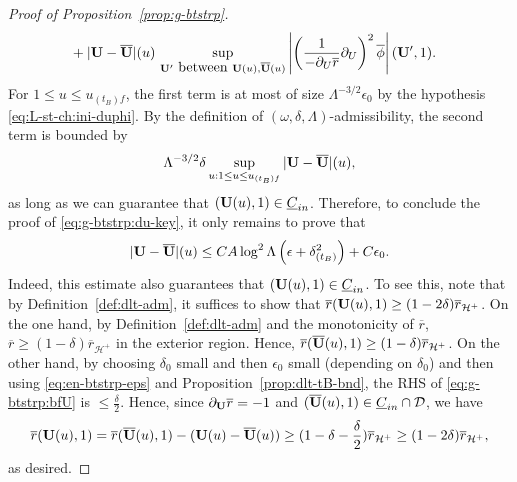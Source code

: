 \documentclass[10pt, reqno]{amsart}
\theoremstyle{definition}
\theoremstyle{remark}
\theoremstyle{conjecture}
\numberwithin{equation}{section}
\newcommand{\abs}[1]{\vert#1\vert}
\newcommand{\rd}{\partial}
\newcommand{\0}{\emptyset}
\newcommand{\dlt}{\delta}
\newcommand{\eps}{\epsilon}
\newcommand{\Lmb}{\Lambda}
\newcommand{\omg}{\omega}
\newcommand{\bfU}{{\bf U}}
\newcommand{\calD}{\mathcal D}
\newcommand{\calH}{\mathcal H}
\newcommand{\uC}{\underline{C}}
\newcommand{\f}{\frac}
\newcommand{\de}{\delta}
\newcommand{\EH}{\calH^{+}}
\newcommand{\bfUbg}{\overline{\bfU}}				%
\newcommand{\phibg}{\overline{\phi}}				%
\newcommand{\rbg}{\overline{r}}					%
\newcommand{\Abs}[1]{\left\vert #1 \right\vert}
\begin{document}
\begin{proof}[Proof of Proposition~\ref{prop:g-btstrp}]
\begin{align*}
		&+ \abs{\bfU - \bfUbg}(u) \, \sup_{\bfU' \hbox{ between } \bfU(u), \bfUbg(u)} \Abs{\left( \frac{1}{-\rd_{U} \rbg} \rd_{U} \right)^{2} \phibg}(\bfU',1).
\end{align*}
For $1 \leq u \leq u_{(t_{B}) f}$, the first term is at most of size $\Lmb^{-3/2} \eps_{0}$ by the hypothesis \eqref{eq:L-st-ch:ini-duphi}. By the definition of $(\omg, \dlt, \Lmb)$-admissibility, the second term is bounded by
\begin{equation*}
	\Lmb^{-3/2} \dlt \sup_{u : 1 \leq u \leq u_{(t_{B}) f}} \abs{\bfU - \bfUbg}(u),
\end{equation*}
as long as we can guarantee that $(\bfU(u), 1) \in \uC_{in}$.
Therefore, to conclude the proof of \eqref{eq:g-btstrp:du-key}, it only remains to prove that 
\begin{equation} \label{eq:g-btstrp:bfU}
\abs{\bfU - \bfUbg}(u) \leq C A \log^2 \Lmb \left( \eps + \dlt_{(t_{B})}^{2} \right)  + C \eps_{0} .
\end{equation}
Indeed, this estimate also guarantees that $(\bfU(u), 1) \in \uC_{in}$. To see this, note that by Definition~\ref{def:dlt-adm}, it suffices to show that $\rbg(\bfU(u),1)\geq (1-2\de) \rbg_{\EH}$. On the one hand, by Definition~\ref{def:dlt-adm} and the monotonicity of $\rbg$, $\rbg\geq (1-\de)\rbg_{\EH}$ in the exterior region. Hence, $\rbg(\overline{\bfU}(u),1)\geq (1-\de)\rbg_{\EH}$. On the other hand, by choosing $\dlt_0$ small and then $\eps_{0}$ small (depending on $\dlt_0$) and then using \eqref{eq:en-btstrp-eps} and Proposition~\ref{prop:dlt-tB-bnd}, the RHS of \eqref{eq:g-btstrp:bfU} is $\leq \f{\de}{2}$. Hence, since $\rd_{\bfU} \rbg=-1$ and $(\overline{\bfU}(u),1)\in \uC_{in} \cap \calD$, we have 
$$\rbg(\bfU(u),1)= \rbg(\overline{\bfU}(u),1)-(\bfU(u)-\overline{\bfU}(u)) \geq (1-\de-\f{\de}{2})\rbg_{\EH} \geq (1-2\de)\rbg_{\EH},$$
as desired.


\end{proof}
\end{document}
